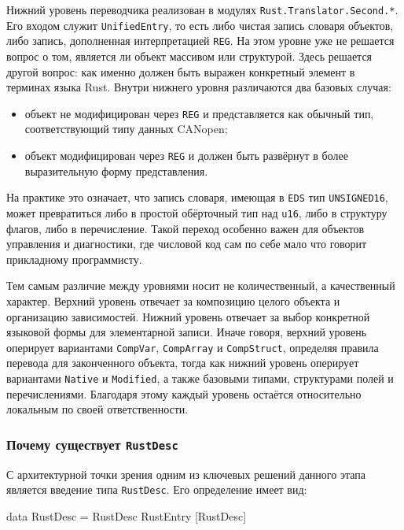 \documentclass[a4paper,12pt]{article}
\begin{document}
Нижний уровень переводчика реализован в модулях
\texttt{Rust.Translator.Second.*}. Его входом служит \texttt{UnifiedEntry}, то есть либо
чистая запись словаря объектов, либо запись, дополненная интерпретацией \texttt{REG}.
На этом уровне уже не решается вопрос о том, является ли объект массивом или
структурой. Здесь решается другой вопрос: как именно должен быть выражен конкретный
элемент в терминах языка Rust. Внутри нижнего уровня различаются два базовых случая:
\begin{itemize}
  \item объект не модифицирован через \texttt{REG} и представляется как обычный тип,
  соответствующий типу данных CANopen;
  \item объект модифицирован через \texttt{REG} и должен быть развёрнут в более
  выразительную форму представления.
\end{itemize}

На практике это означает, что запись словаря, имеющая в \texttt{EDS} тип
\texttt{UNSIGNED16}, может превратиться либо в простой обёрточный тип над
\texttt{u16}, либо в структуру флагов, либо в перечисление. Такой переход особенно
важен для объектов управления и диагностики, где числовой код сам по себе мало что
говорит прикладному программисту.

Тем самым различие между уровнями носит не количественный, а качественный характер.
Верхний уровень отвечает за композицию целого объекта и организацию зависимостей.
Нижний уровень отвечает за выбор конкретной языковой формы для элементарной записи.
Иначе говоря, верхний уровень оперирует вариантами \texttt{CompVar},
\texttt{CompArray} и \texttt{CompStruct}, определяя правила перевода для законченного
объекта, тогда как нижний уровень оперирует вариантами \texttt{Native} и
\texttt{Modified}, а также базовыми типами, структурами полей и перечислениями.
Благодаря этому каждый уровень остаётся относительно локальным по своей ответственности.

\subsubsection{Почему существует \texttt{RustDesc}}

С архитектурной точки зрения одним из ключевых решений данного этапа является введение
типа \texttt{RustDesc}. Его определение имеет вид:

\begin{flushleft}
\label{lst:rust-desc}
\begin{MyCodes}
data RustDesc = RustDesc RustEntry [RustDesc]
\end{MyCodes}
\end{flushleft}
\end{document}
